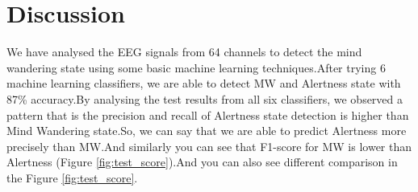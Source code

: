
\chapter{Discussion} %

\label{Chapter6} %



We have analysed the EEG signals from 64 channels to detect the mind wandering state using some basic machine learning techniques.After trying 6 machine learning classifiers, we are able to detect MW and Alertness state with 87\% accuracy.By analysing the test results from all six classifiers, we observed a pattern that is the precision and recall of  Alertness state detection is higher than  Mind Wandering state.So, we can say that we are able to predict Alertness more precisely than MW.And similarly you can see  that F1-score for MW is lower than Alertness (Figure \ref{fig:test_score}).And you can also see different comparison in the Figure \ref{fig:test_score}.


